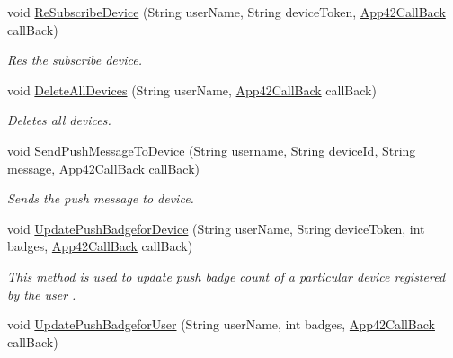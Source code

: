 \begin{DoxyCompactItemize}
void \hyperlink{classcom_1_1shephertz_1_1app42_1_1paas_1_1sdk_1_1csharp_1_1push_notification_1_1_push_notification_service_ac9ec9e18d0f5839ceb54ccf341740489}{Re\+Subscribe\+Device} (String user\+Name, String device\+Token, \hyperlink{interfacecom_1_1shephertz_1_1app42_1_1paas_1_1sdk_1_1csharp_1_1_app42_call_back}{App42\+Call\+Back} call\+Back)
\begin{DoxyCompactList}\small\item\em Res the subscribe device. \end{DoxyCompactList}\item 
void \hyperlink{classcom_1_1shephertz_1_1app42_1_1paas_1_1sdk_1_1csharp_1_1push_notification_1_1_push_notification_service_af01fcdc01a191bf71cac20ca577ed7f9}{Delete\+All\+Devices} (String user\+Name, \hyperlink{interfacecom_1_1shephertz_1_1app42_1_1paas_1_1sdk_1_1csharp_1_1_app42_call_back}{App42\+Call\+Back} call\+Back)
\begin{DoxyCompactList}\small\item\em Deletes all devices. \end{DoxyCompactList}\item 
void \hyperlink{classcom_1_1shephertz_1_1app42_1_1paas_1_1sdk_1_1csharp_1_1push_notification_1_1_push_notification_service_a72a0d889b2daa513d51762770ac33f0a}{Send\+Push\+Message\+To\+Device} (String username, String device\+Id, String message, \hyperlink{interfacecom_1_1shephertz_1_1app42_1_1paas_1_1sdk_1_1csharp_1_1_app42_call_back}{App42\+Call\+Back} call\+Back)
\begin{DoxyCompactList}\small\item\em Sends the push message to device. \end{DoxyCompactList}\item 
void \hyperlink{classcom_1_1shephertz_1_1app42_1_1paas_1_1sdk_1_1csharp_1_1push_notification_1_1_push_notification_service_a84c4b14728fdced582417a5a2ad96bb3}{Update\+Push\+Badgefor\+Device} (String user\+Name, String device\+Token, int badges, \hyperlink{interfacecom_1_1shephertz_1_1app42_1_1paas_1_1sdk_1_1csharp_1_1_app42_call_back}{App42\+Call\+Back} call\+Back)
\begin{DoxyCompactList}\small\item\em This method is used to update push badge count of a particular device registered by the user . \end{DoxyCompactList}\item 
void \hyperlink{classcom_1_1shephertz_1_1app42_1_1paas_1_1sdk_1_1csharp_1_1push_notification_1_1_push_notification_service_a5640b095c350c28a9d5e786e60bffb7c}{Update\+Push\+Badgefor\+User} (String user\+Name, int badges, \hyperlink{interfacecom_1_1shephertz_1_1app42_1_1paas_1_1sdk_1_1csharp_1_1_app42_call_back}{App42\+Call\+Back} call\+Back)

\end{DoxyCompactItemize}
